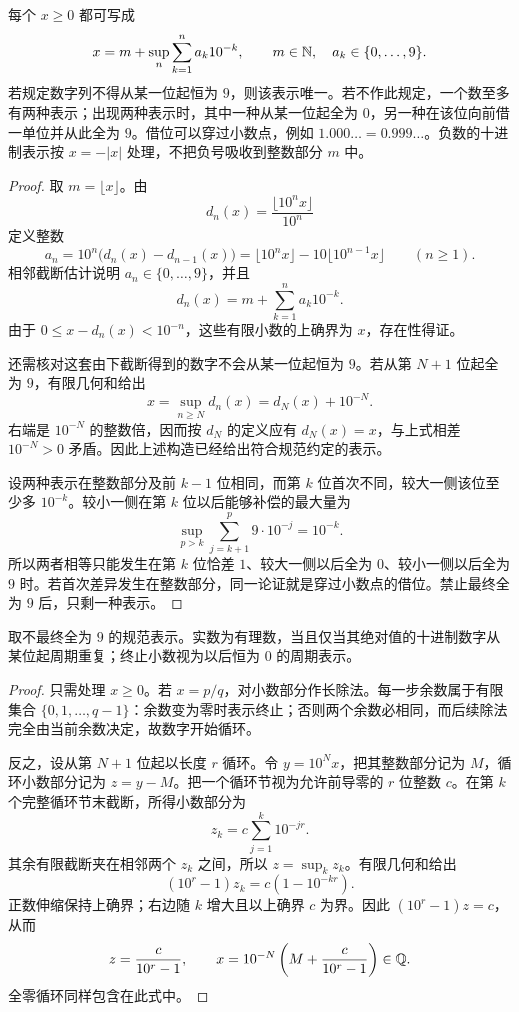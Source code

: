 \begin{theorem}[十进制表示]
每个 \(x\ge0\) 都可写成
\[
 x=m+\sup_n\sum_{k=1}^n a_k10^{-k},
 \qquad m\in\mathbb{N},\quad a_k\in\{0,\ldots,9\}.
\]
若规定数字列不得从某一位起恒为 \(9\)，则该表示唯一。若不作此规定，一个数至多有两种表示；出现两种表示时，其中一种从某一位起全为 \(0\)，另一种在该位向前借一单位并从此全为 \(9\)。借位可以穿过小数点，例如 \(1.000\ldots=0.999\ldots\)。负数的十进制表示按 \(x=-|x|\) 处理，不把负号吸收到整数部分 \(m\) 中。
\end{theorem}

\begin{proof}
取 \(m=\lfloor x\rfloor\)。由
\[
  d_n(x)=\frac{\lfloor10^nx\rfloor}{10^n}
\]
定义整数
\[
  a_n=10^n\bigl(d_n(x)-d_{n-1}(x)\bigr)
      =\lfloor10^n x\rfloor-10\lfloor10^{n-1}x\rfloor
      \qquad(n\ge1).
\]
相邻截断估计说明 \(a_n\in\{0,\ldots,9\}\)，并且
\[
  d_n(x)=m+\sum_{k=1}^n a_k10^{-k}.
\]
由于 \(0\le x-d_n(x)<10^{-n}\)，这些有限小数的上确界为 \(x\)，存在性得证。

还需核对这套由下截断得到的数字不会从某一位起恒为 \(9\)。若从第 \(N+1\) 位起全为 \(9\)，有限几何和给出
\[
 x=\sup_{n\ge N}d_n(x)=d_N(x)+10^{-N}.
\]
右端是 \(10^{-N}\) 的整数倍，因而按 \(d_N\) 的定义应有
\(d_N(x)=x\)，与上式相差 \(10^{-N}>0\) 矛盾。因此上述构造已经给出符合规范约定的表示。

设两种表示在整数部分及前 \(k-1\) 位相同，而第 \(k\) 位首次不同，较大一侧该位至少多 \(10^{-k}\)。较小一侧在第 \(k\) 位以后能够补偿的最大量为
\[
  \sup_{p>k}\sum_{j=k+1}^{p}9\cdot10^{-j}=10^{-k}.
\]
所以两者相等只能发生在第 \(k\) 位恰差 \(1\)、较大一侧以后全为 \(0\)、较小一侧以后全为 \(9\) 时。若首次差异发生在整数部分，同一论证就是穿过小数点的借位。禁止最终全为 \(9\) 后，只剩一种表示。
\end{proof}

\begin{theorem}[有理数与循环小数]
取不最终全为 \(9\) 的规范表示。实数为有理数，当且仅当其绝对值的十进制数字从某位起周期重复；终止小数视为以后恒为 \(0\) 的周期表示。
\end{theorem}

\begin{proof}
只需处理 \(x\ge0\)。若 \(x=p/q\)，对小数部分作长除法。每一步余数属于有限集合 \(\{0,1,\ldots,q-1\}\)：余数变为零时表示终止；否则两个余数必相同，而后续除法完全由当前余数决定，故数字开始循环。

反之，设从第 \(N+1\) 位起以长度 \(r\) 循环。令 \(y=10^Nx\)，把其整数部分记为 \(M\)，循环小数部分记为 \(z=y-M\)。把一个循环节视为允许前导零的 \(r\) 位整数 \(c\)。在第 \(k\) 个完整循环节末截断，所得小数部分为
\[
 z_k=c\sum_{j=1}^{k}10^{-jr}.
\]
其余有限截断夹在相邻两个 \(z_k\) 之间，所以 \(z=\sup_k z_k\)。有限几何和给出
\[
 (10^r-1)z_k=c(1-10^{-kr}).
\]
正数伸缩保持上确界；右边随 \(k\) 增大且以上确界 \(c\) 为界。因此
\((10^r-1)z=c\)，从而
\[
  z=\frac{c}{10^r-1},\qquad
  x=10^{-N}\left(M+\frac{c}{10^r-1}\right)\in\mathbb{Q}.
\]
全零循环同样包含在此式中。
\end{proof}

